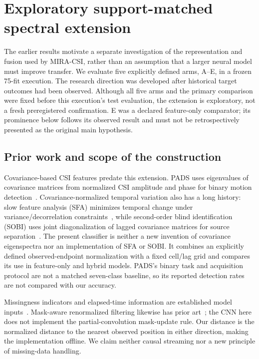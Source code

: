 \section{Exploratory support-matched spectral extension}
\label{sec:m2-extension}

The earlier results motivate a separate investigation of the representation and
fusion used by MIRA-CSI, rather than an assumption that a larger neural model
must improve transfer. We evaluate five explicitly defined arms, A--E, in a
frozen 75-fit execution. The research direction was developed after historical
target outcomes had been observed. Although all five arms and the primary
comparison were fixed before this execution's test evaluation, the extension
is exploratory, not a fresh preregistered confirmation. E was a declared
feature-only comparator; its prominence below follows its observed result and
must not be retrospectively presented as the original main hypothesis.

\subsection*{Prior work and scope of the construction}
Covariance-based CSI features predate this extension. PADS uses eigenvalues of
covariance matrices from normalized CSI amplitude and phase for binary motion
detection~\cite{m2pads}. Covariance-normalized temporal variation also has a
long history: slow feature analysis (SFA) minimizes temporal change under
variance/decorrelation constraints~\cite{m2sfa}, while second-order blind
identification (SOBI) uses joint diagonalization of lagged covariance matrices
for source separation~\cite{m2sobi}. The present classifier is neither a new
invention of covariance eigenspectra nor an implementation of SFA or SOBI.
It combines an explicitly defined observed-endpoint normalization with a
fixed cell/lag grid and compares its use in feature-only and hybrid models.
PADS's binary task and acquisition protocol are not a matched seven-class
baseline, so its reported detection rates are not compared with our accuracy.

Missingness indicators and elapsed-time information are established model
inputs~\cite{che2018}. Mask-aware renormalized filtering likewise has prior
art~\cite{m2partial}; the CNN here does not implement the partial-convolution
mask-update rule. Our distance is the normalized distance to the nearest
observed position in either direction, making the implementation offline.
We claim neither causal streaming nor a new principle of missing-data handling.

